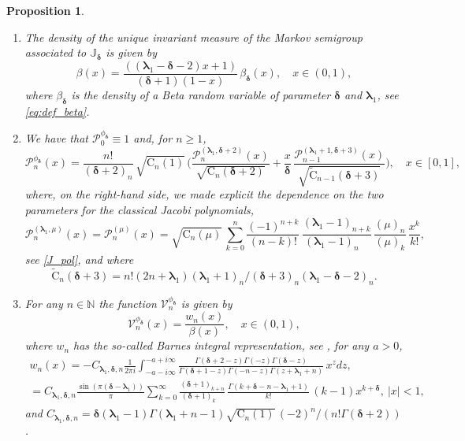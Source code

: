 \documentclass[JEP,XML,SOM,Unicode]{cedram}
\theoremstyle{plain}
\newtheorem{proposition}[theorem]{Proposition}
\theoremstyle{definition}
\newcommand{\N}{\mathbb{N}}
\renewcommand{\P}{\mathcal{P}}
\newcommand{\V}{\mathcal{V}}
\newcommand{\C}{{\mathrm{C}}}
\newcommand{\calJ}{\mathds{J}}
\newcommand{\lam}{{\bm{\lambda}_1}}
\newcommand{\mm}{{\bm{\delta}}}
\newcommand{\gab}[1][\lam,\mo]{{\beta_{#1}}}
\let\mo\mu
\let\bpsi\beta
\begin{document}
\skpt
\begin{proposition}
\label{prop:small-perturbation}
\begin{enumerate}
\item \label{item-1:prop:small-perturbation} The density of the unique invariant measure of the Markov semigroup associated to $\calJ_\mm$ is given by
\begin{equation*}
\beta(x) = \frac{((\lam - \mm - 2)x+1)}{(\mm+1)(1-x)}\, \gab[\mm](x), \quad x \in (0,1),
\end{equation*}
where $\gab[\mm]$ is the density of a Beta random variable of parameter $\mm$ and $\lam$, see \eqref{eq:def_beta}.
\item \label{item-2:prop:small-perturbation} We have that $\P_0^{\phi_\mm} \equiv 1$ and, for $n \geq 1$,
\begin{equation*}
\P_n^{\phi_\mm}(x)= \frac{n!}{(\mm+2)_n}\, \sqrt{\C_n(1)}\, \biggl( \frac{\P_n^{(\lam,\mm+2 )} (x)}{\sqrt{\C_n(\mm+2)}} + \frac{x}{\mm}\, \frac{\P_{n-1}^{(\lam+1,\mm+3)}(x)}{\sqrt{\widetilde{\C}_{n-1}(\mm+3)}} \biggr), \quad x \in [0,1],
\end{equation*}
where, on the right-hand side, we made explicit the dependence on the two parameters for the classical Jacobi polynomials, \ie
\[
\P_n^{(\lam,\mo)} (x)=\P_n^{(\mo)} (x)=\sqrt{\C_n(\mo)}\, \sum_{k=0}^n \frac{(-1)^{n+k}}{(n-k)!}\, \frac{(\lam-1)_{n+k}}{(\lam-1)_{n\phantom{+k}}}\, \frac{(\mo)_n}{(\mo)_k}\, \frac{x^k}{k!},
\]
see \eqref{J_pol}, and where
\[
\widetilde{\C}_{n}(\mm+3) = n!(2n+\lam)(\lam+1)_n / (\mm+3)_n(\lam-\mm-2)_n.
\]

\item \label{item-3:prop:small-perturbation} For any $n \in \N$ the function $\V_n^{\phi_\mm}$ is given by
\begin{equation*}
\V_n^{\phi_\mm}(x) = \frac{w_n(x)}{\bpsi(x)}, \quad x \in (0,1),
\end{equation*}
where $w_n$ has the so-called Barnes integral representation, see \eg \cite{barnes_integrals}, for any $a>0$,
\begin{multline*}
w_n(x)
= -C_{\lam, \mm, n} \frac{1}{2 \pi i} \int_{-a - i \infty}^{-a + i \infty} \frac{\Gamma(\mm+2-z)\Gamma(-z)\Gamma(\mm-z)}{\Gamma(\mm+1-z)\Gamma(-n-z)\Gamma(z+\lam+n)}\, x^{z}dz, \\
= C_{\lam, \mm, n} \frac{\sin(\pi(\mm-\lam))}{\pi} \sum_{k = 0}^{\infty} \frac{(\mm+1)_{k+n}}{(\mm+1)_{k\phantom{+n}}}\, \frac{\Gamma(k+\mm-n-\lam+1)}{k!}\,(k-1) x^{k+\mm}, \ |x|<1,
\end{multline*}
and $C_{\lam, \mm, n} = \mm(\lam - 1) \Gamma(\lam+n-1) \sqrt{\C_n(1)}\, (-2)^n / (n!\Gamma(\mm+2))$.
\end{enumerate}
\end{proposition}
\end{document}
